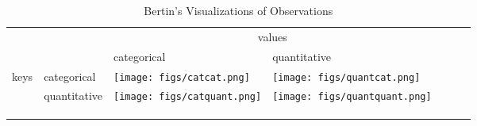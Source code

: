 \begin{table}[]
\centering
\begin{tabularx}{\textwidth}{lllllll}
\cline{1-4}
\multicolumn{2}{|l|}{\multirow{2}{*}{}}                                  & \multicolumn{2}{c|}{values}                                        &  &  &  \\ \cline{3-4}
\multicolumn{2}{|l|}{}                                                   & \multicolumn{1}{l|}{categorical} & \multicolumn{1}{l|}{quantitative} &  &  &  \\ \cline{1-4}
\multicolumn{1}{|l|}{\multirow{2}{*}{keys}} & \multicolumn{1}{l|}{categorical}   & \multicolumn{1}{l|}{\texttt{[image: figs/catcat.png]}}           & \multicolumn{1}{l|}{\texttt{[image: figs/quantcat.png]}}          &  &  &  \\ \cline{2-4}
\multicolumn{1}{|l|}{}                      & \multicolumn{1}{l|}{quantitative} & \multicolumn{1}{l|}{\texttt{[image: figs/catquant.png]}}           & \multicolumn{1}{l|}{\texttt{[image: figs/quantquant.png]}}          &  &  &  \\ \cline{1-4}
                                            &                            &                                  &                                 &  &  &  \\
                                            &                            &                                  &                                 &  &  &  \\
                                            &                            &                                  &                                 &  &  & 
\end{tabularx}
\caption{Bertin's Visualizations of Observations}

\end{table}